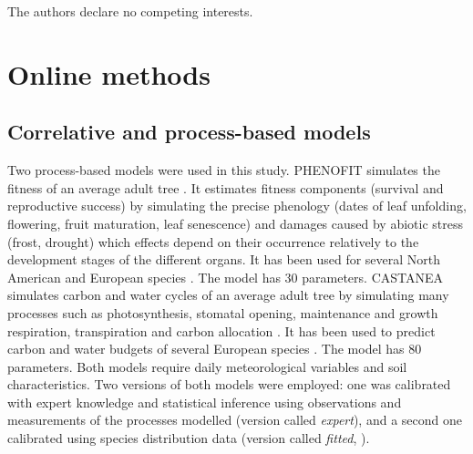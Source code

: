 \documentclass[pdflatex, sn-nature]{sn-jnl}%
\newcommand{\textappr}{\raisebox{0.5ex}{\texttildelow}} %
\begin{document}
The authors declare no competing interests.





\section{Online methods}\label{methods}

\subsection{Correlative and process-based models}\label{models}

Two process-based models were used in this study. 
PHENOFIT simulates the fitness of an average adult tree \cite{Chuine2001}. It estimates fitness components (survival and reproductive success) by simulating the precise phenology (dates of leaf unfolding, flowering, fruit maturation, leaf senescence) and damages caused by abiotic stress (frost, drought) which effects depend on their occurrence relatively to the development stages of the different organs. It has been used for several North American and European species \cite{Morin2007, Saltre2013, Duputie2015, Gauzere2020}. The model has \textappr30 parameters. 
CASTANEA simulates carbon and water cycles of an average adult tree by simulating many processes such as photosynthesis, stomatal opening, maintenance and growth respiration, transpiration and carbon allocation  \cite{Dufrene2005}. It has been used to predict carbon and water budgets of several European species \cite{Davi2006, Delpierre2012, Davi2017}. 
The model has \textappr80 parameters. 
Both models require daily meteorological variables and soil characteristics. 
Two versions of both models were employed: one was calibrated with expert knowledge and statistical inference using observations and measurements of the processes modelled (version called \emph{expert}), and a second one calibrated using species distribution data (version called \emph{fitted}, \cite{VanderMeersch2023}).
  
\end{document}
